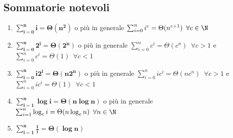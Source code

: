 \documentclass[11pt, a4paper, titlepage, oneside]{scrbook}
\begin{document}
\subsection{Sommatorie notevoli}

\begin{Proprieta}
\label{prop-sommatorie-notevoli}
\begin{enumerate}
    \item $\bm{\sum_{i = 0}^n i = \Theta(n^2)}$ o più in generale $\sum_{i = 0}^n i^c = \Theta(n^{c+1}) \enspace \forall c \in \N$
    \item $\bm{\sum_{i = 0}^n 2^i  = \Theta(2^n)}$ o più in generale $\sum_{i = 0}^n c^i = \Theta(c^n) \enspace \forall c > 1$ e \mbox{$\sum_{i = 0}^n c^i = \Theta(1) \enspace \forall c < 1$}
    \item $\bm{\sum_{i = 0}^n i2^i = \Theta(n2^n)}$ o più in generale $\sum_{i = 0}^n i c^i = \Theta(n c^n) \enspace \forall c > 1$ e \mbox{$\sum_{i = 0}^n ic^i = \Theta(1) \enspace \forall c < 1$}
    \item $\bm{\sum_{i = 1}^n \log i =  \Theta(n \log n)}$ o più in generale $\sum_{i = 1}^n \log_c i = \Theta(n \log_c n) \enspace \forall n \in \N$
    \item $\bm{\sum_{i = 1}^n \frac{1}{i} = \Theta(\log n)}$
\end{enumerate}
\end{Proprieta}

\Dimostrazione \nopagebreak
\end{document}
